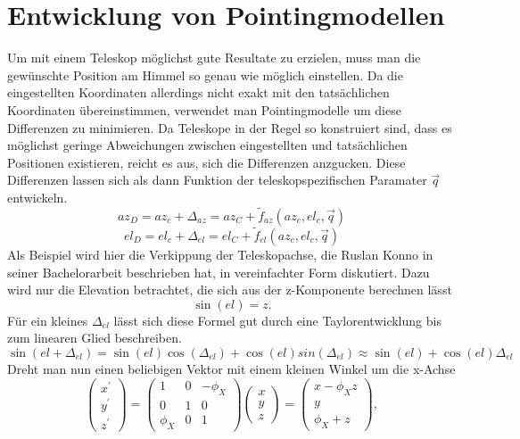 \section{Entwicklung von Pointingmodellen}
Um mit einem Teleskop möglichst gute Resultate zu erzielen, muss man die gewünschte Position am Himmel so genau wie möglich einstellen. Da die eingestellten Koordinaten allerdings nicht exakt mit den tatsächlichen Koordinaten übereinstimmen, verwendet man Pointingmodelle um diese Differenzen zu minimieren. Da Teleskope in der Regel so konstruiert sind, dass es möglichst geringe Abweichungen zwischen eingestellten und tatsächlichen Positionen existieren, reicht es aus, sich die Differenzen anzgucken. Diese Differenzen lassen sich als dann Funktion der teleskopspezifischen Paramater $\vec{q}$ entwickeln.
\begin{equation}
az_D=az_c+\Delta_{az}=az_C+\tilde{f}_{az}\left(az_c,el_c,\vec{q}\right)
\end{equation}
\begin{equation}
el_D=el_c+\Delta_{el}=el_C+\tilde{f}_{el}\left(az_c,el_c,\vec{q}\right)
\label{eq:pointingZero}
\end{equation}
Als Beispiel wird hier die Verkippung der Teleskopachse, die Ruslan Konno in seiner Bachelorarbeit \cite{Ruslan} beschrieben hat, in vereinfachter Form diskutiert. Dazu wird nur die Elevation betrachtet, die sich aus der z-Komponente berechnen lässt
\begin{equation}
\sin(el)=z.
\end{equation}
Für ein kleines $\Delta_{el}$ lässt sich diese Formel gut durch eine Taylorentwicklung bis zum linearen Glied beschreiben.
\begin{equation}
\sin(el+\Delta_{el})=\sin(el)\cos(\Delta_{el})+\cos(el)sin(\Delta_{el})\approx \sin(el)+\cos(el)\Delta_{el}
\end{equation}
Dreht man nun einen beliebigen Vektor mit einem kleinen Winkel um die x-Achse
\begin{equation}
\left(\begin{array}{c}
x^{\prime}\\y^{\prime}\\z^{\prime}
\end{array}\right)=\left(\begin{array}{ccc}
1 & 0 & -\phi_X\\0 & 1 & 0 \\\phi_X & 0 & 1
\end{array}\right)\left(\begin{array}{c}
x\\y\\z
\end{array}\right)=\left(\begin{array}{c}
x-\phi_Xz\\y\\\phi_X+z
\end{array}\right),
\end{equation}
